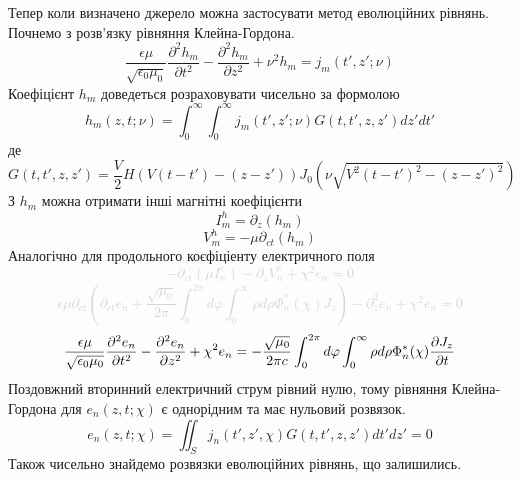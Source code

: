 Тепер коли визначено джерело можна застосувати метод еволюційних рівнянь.
Почнемо з розв'язку рівняння Клейна-Гордона.
%
\begin{equation*}
\frac{\epsilon \mu}{ \sqrt{\epsilon_0 \mu_0}} 
\frac{\partial^2 h_m}{\partial t^2} - \frac{\partial^2 h_m}{\partial z^2} + 
\nu^2 h_m = j_m (t',z'; \nu)
\end{equation*}
%
Коефіцієнт $ h_m $ доведеться розраховувати чисельно за формолою
%
\begin{equation*}
h_m (z, t; \nu) = \int_{0}^{\infty} \int_{0}^{\infty}
j_m (t',z'; \nu) G(t,t',z,z') dz' dt'
\end{equation*}
%
де 
%
\begin{equation*}
G(t,t',z,z') = \frac{\mathit{V}}{2} H \left( \mathit{V} (t-t') - (z-z') \right)
J_0 \left( \nu \sqrt{\mathit{V}^2 (t-t')^2 - (z-z')^2} \right)
\end{equation*}
%
З $ h_m $ можна отримати інші магнітні коефіцієнти
%
\begin{equation*}
I_m^h = \partial_z (h_m)
\end{equation*}
%
\begin{equation*}
V_m^h = - \mu \partial_{ct} (h_m)
\end{equation*}
%
Аналогічно для продольного коєфіціенту електричного поля
%
\textcolor{lightgray}{ \begin{equation*}
- \partial_{ct}(\mu I_n^e) - \partial_z V_n^e + \chi^2 e_n = 0
\end{equation*} }
%
\textcolor{lightgray}{ \begin{equation*}
\epsilon \mu \partial_{ct} \left( \partial_{ct} e_n + 
\frac{\sqrt{\mu_0}}{2 \pi} \int_0^{2\pi} d \varphi 
\int_0^{\infty} \rho d \rho \Phi_n^* (\chi) J_z \right) - 
\partial^2_z e_n + \chi^2 e_n = 0
\end{equation*} }
%
\begin{equation*}
\frac{\epsilon \mu}{ \sqrt{\epsilon_0 \mu_0}} 
\frac{\partial^2 e_n}{\partial t^2} - 
\frac{\partial^2 e_n}{\partial z^2} + \chi^2 e_n = 
- \frac{\sqrt{\mu_0}}{2 \pi c} 
\int_0^{2\pi} d \varphi 
\int_0^{\infty} \rho d \rho \Phi_n^* (\chi) \frac{\partial J_z}{\partial t}
\end{equation*}
%
Поздовжний вторинний електричний струм рівний нулю, тому рівняння 
Клейна-Гордона для $ e_n (z, t; \chi) $ є однорідним та має нульовий розвязок.
%
\begin{equation*}
e_n (z, t; \chi) = \iint_S j_n (t',z', \chi) G(t,t',z,z') dt' dz' = 0
\end{equation*}
%
Також чисельно знайдемо розвязки еволюційних рівнянь, що залишились.
